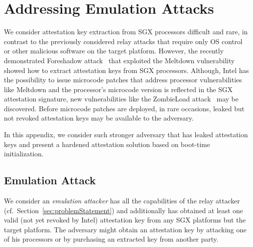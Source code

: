 


\section{Addressing Emulation Attacks}
\label{sec:variantII}

We consider attestation key extraction from SGX processors difficult and rare, in contrast to the previously considered relay attacks that require only OS control or other malicious software on the target platform. However, the recently demonstrated Foreshadow attack~\cite{foreshadow-usenix18} that exploited the Meltdown vulnerability~\cite{Lipp2018meltdown} showed how to extract attestation keys from SGX processors. Although, Intel has the possibility to issue microcode patches that address processor vulnerabilities like Meltdown and the processor's microcode version is reflected in the SGX attestation signature, new vulnerabilities like the ZombieLoad attack~\cite{ZombieLoad} may be discovered. Before microcode patches are deployed, in rare occasions, leaked but not revoked attestation keys may be available to the adversary.

In this appendix, we consider such stronger adversary that has leaked attestation keys and present a hardened attestation solution based on boot-time initialization.

\subsection{Emulation Attack} 

 We consider an \emph{emulation attacker} has all the capabilities of the relay attacker (cf.\ Section~\ref{sec:problemStatement}) and additionally has obtained at least one valid (not yet revoked by Intel) attestation key from any SGX platforms but the target platform. The adversary might obtain an attestation key by attacking one of his processors or by purchasing an extracted key from another party. 

